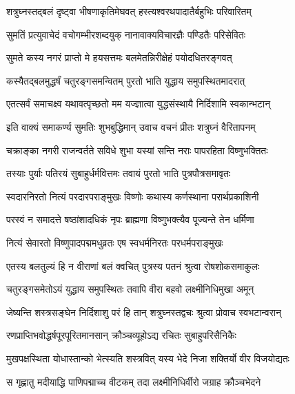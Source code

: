 
\twolineshloka
{शत्रुघ्नस्तद्बलं दृष्ट्वा भीषणाकृतिमेघवत्}
{हस्त्यश्वरथपादातैर्बहुभिः परिवारितम्}%

\twolineshloka
{सुमतिं प्रत्युवाचेदं वचोगम्भीरशब्दयुक्}
{नानावाक्यविचारज्ञैः पण्डितैः परिसेवितः}%


\twolineshloka
{सुमते कस्य नगरं प्राप्तो मे हयसत्तमः}
{बलमेतन्निरीक्षेहं पयोदधितरङ्गवत्}%

\twolineshloka
{कस्यैतद्बलमुद्धर्षं चतुरङ्गसमन्वितम्}
{पुरतो भाति युद्धाय समुपस्थितमादरात्}%

\twolineshloka
{एतत्सर्वं समाचक्ष्व यथावत्पृच्छतो मम}
{यज्ज्ञात्वा युद्धसंस्थायै निर्दिशामि स्वकान्भटान्}%

\twolineshloka
{इति वाक्यं समाकर्ण्य सुमतिः शुभबुद्धिमान्}
{उवाच वचनं प्रीतः शत्रुघ्नं वैरितापनम्}%


\twolineshloka
{चक्राङ्का नगरी राजन्वर्तते सविधे शुभा}
{यस्यां सन्ति नराः पापरहिता विष्णुभक्तितः}%

\twolineshloka
{तस्याः पुर्याः पतिरयं सुबाहुर्धर्मवित्तमः}
{तवायं पुरतो भाति पुत्रपौत्रसमावृतः}%

\twolineshloka
{स्वदारनिरतो नित्यं परदारपराङ्मुखः}
{विष्णोः कथास्य कर्णस्थाना परार्थप्रकाशिनी}%

\twolineshloka
{परस्वं न समादत्ते षष्ठांशादधिकं नृपः}
{ब्राह्मणा विष्णुभक्त्यैव पूज्यन्ते तेन धर्मिणा}%

\twolineshloka
{नित्यं सेवारतो विष्णुपादपद्ममधुव्रतः}
{एष स्वधर्मनिरतः परधर्मपराङ्मुखः}%

\twolineshloka
{एतस्य बलतुल्यं हि न वीराणां बलं क्वचित्}
{पुत्रस्य पतनं श्रुत्वा रोषशोकसमाकुलः}%

\twolineshloka
{चतुरङ्गसमेतोऽयं युद्धाय समुपस्थितः}
{तवापि वीरा बहवो लक्ष्मीनिधिमुखा अमून्}%

\twolineshloka
{जेष्यन्ति शस्त्रसङ्घेन निर्दिशाशु परं हि तान्}
{शत्रुघ्नस्तद्वचः श्रुत्वा प्रोवाच स्वभटान्वरान्}%

\twolineshloka
{रणप्राप्तिभवोद्धर्षपूरपूरितमानसान्}
{क्रौञ्चव्यूहोऽद्य रचितः सुबाहुपरिसैनिकैः}%

\twolineshloka
{मुखपक्षस्थिता योधास्तान्को भेत्स्यति शस्त्रवित्}
{यस्य भेदे निजा शक्तिर्यो वीर विजयोद्यतः}%

\twolineshloka
{स गृह्णातु मदीयाद्धि पाणिपद्माच्च वीटकम्}
{तदा लक्ष्मीनिधिर्वीरो जग्राह क्रौञ्चभेदने}%

